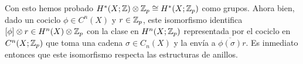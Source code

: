 \documentclass[twoside]{article}
\begin{document}
\begin{solucion}
Con esto hemos probado $H^*(X;\mathbb{Z})\otimes \mathbb{Z}_p\cong H^*(X;\mathbb{Z}_p)$ como grupos. Ahora bien, dado un cociclo  $\phi\in C^n(X)$ y $r\in \mathbb{Z}_p$, este isomorfismo identifica $[\phi]\otimes r\in H^n(X)\otimes \mathbb{Z}_p$ con la clase en $H^n(X;\mathbb{Z}_p)$ representada por el cociclo en $C^n(X;\mathbb{Z}_p)$ que toma una cadena $\sigma\in C_n(X)$ y la envía a $\overline{\phi(\sigma)}r$. Es inmediato entonces que este isomorfismo respecta las estructuras de anillos.




%
%
\end{solucion}

\newpage
\end{document}
